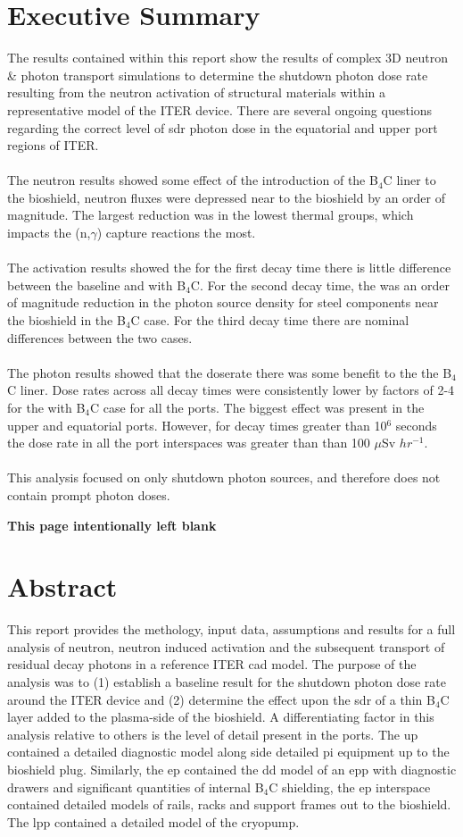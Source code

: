 \documentclass[12pt]{article}
\newcommand*{\blankpage}{%
\vspace*{\fill}
\begin{center}
 \centering \textbf{This page intentionally left blank}
\end{center}
\vspace{\fill}}
\begin{document}
\section*{Executive Summary}
The results contained within this report show the results of complex 3D neutron
\& photon transport simulations to determine the shutdown photon dose rate
resulting from the neutron activation of structural materials within a
representative model of the ITER device. There are several ongoing questions
regarding the correct level of \gls{sdr} photon dose in the equatorial and upper
port regions of ITER.
\\
\\
The neutron results showed some effect of the introduction of the B$_4$C liner 
to the bioshield, neutron fluxes were depressed near to the bioshield by an 
order of magnitude. The largest reduction was in the lowest thermal groups, 
which impacts the (n,$\gamma$) capture reactions the most.
\\
\\
The activation results showed the for the first decay time there is little 
difference between the baseline and with B$_4$C. For the second decay time, 
the was an order of magnitude reduction in the photon source density for 
steel components near the bioshield in the B$_4$C case. For the third decay
time there are nominal differences between the two cases.
\\
\\
The photon results showed that the doserate there was some benefit to the 
the B$_4$C liner. Dose rates across all decay times were consistently lower
by factors of 2-4 for the with B$_4$C case for all the ports. The biggest effect
was present in the upper and equatorial ports. However, for decay times greater
than 10$^6$ seconds the dose rate in all the port interspaces was greater than
than 100 $\mu$Sv $hr^{-1}$. 
\\
\\
This analysis focused on only shutdown photon sources, and therefore does not
contain prompt photon doses.
\newpage
\blankpage
\newpage
\section*{Abstract}
This report provides the methology, input data, assumptions and results for a
full analysis of neutron, neutron induced activation and the subsequent
transport of residual decay photons in a reference ITER \gls{cad} model. The 
purpose of the analysis was to (1) establish a baseline result for the shutdown 
photon dose rate around the ITER device and (2) determine the effect upon the 
\gls{sdr} of a thin B$_4$C layer added to the plasma-side of the bioshield. A 
differentiating factor in this analysis relative to others is the level of 
detail present in the ports. The \gls{up} contained a detailed diagnostic model 
along side detailed \gls{pi} equipment up to the bioshield plug. Similarly, the 
\gls{ep} contained the \gls{dd} model of an \gls{epp} with diagnostic drawers 
and significant quantities of internal B$_4$C shielding, the \gls{ep} interspace
contained detailed models of rails, racks and support frames out to the 
bioshield. The \gls{lpp} contained a detailed model of the cryopump. 
\newpage
\end{document}
